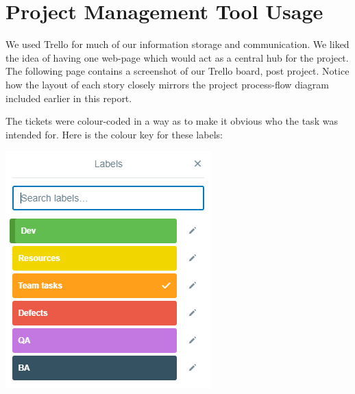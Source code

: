 \documentclass[12pt]{article}
\begin{document}
\section{Project Management Tool Usage}

We used Trello for much of our information storage and communication. We liked the idea of having one web-page which would act as a central hub for the project. The following page contains a screenshot of our Trello board, post project. Notice how the layout of each story closely mirrors the project process-flow diagram included earlier in this report.

\noindent{}

The tickets were colour-coded in a way as to make it obvious who the task was intended for. Here is the colour key for these labels:

\begin{center}
    \includegraphics{images/trello2.png}
\end{center}
\end{document}
